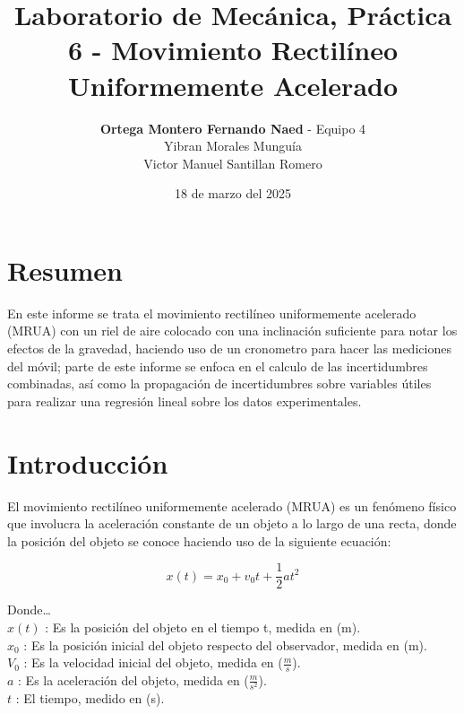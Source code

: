 \documentclass[12pt,a4paper]{article}
\begin{document}
\title{Laboratorio de Mecánica, Práctica 6 - Movimiento Rectilíneo Uniformemente Acelerado}
\date{18 de marzo del 2025}
\author{\textbf{Ortega Montero Fernando Naed} - Equipo 4\\
Yibran Morales Munguía\\
Victor Manuel Santillan Romero}
\maketitle
\section{Resumen} 

En este informe se trata el movimiento rectilíneo uniformemente acelerado (MRUA) con un riel de aire colocado con una inclinación suficiente para notar los efectos de la gravedad, haciendo uso de un cronometro para hacer las mediciones del móvil; parte de este informe se enfoca en el calculo de las incertidumbres combinadas, así como la propagación de incertidumbres sobre variables útiles para realizar una regresión lineal sobre los datos experimentales. 

\section{Introducción}

El movimiento rectilíneo uniformemente acelerado (MRUA) es un fenómeno físico que involucra la aceleración constante de un objeto a lo largo de una recta, donde la posición del objeto se conoce haciendo uso de la siguiente ecuación:

\[x(t) = x_0 + v_0 t + \frac{1}{2} a t^2\]

Donde…\\

$x(t)$ : Es la posición del objeto en el tiempo t, medida en (m).\\ 

$x_0$ : Es la posición inicial del objeto respecto del observador, medida en (m).\\

$V_0$ : Es la velocidad inicial del objeto, medida en ($\frac{m}{s}$).\\

$a$ : Es la aceleración del objeto, medida en ($\frac{m}{s^2}$).\\

$t$ : El tiempo, medido en (s).\\
\end{document}
